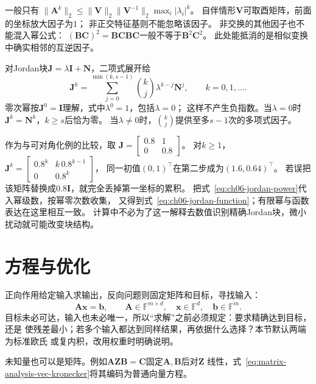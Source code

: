 一般只有
$\lVert\bm A^k\rVert_2\leq
\lVert\bm V\rVert_2\lVert\bm V^{-1}\rVert_2\max_i|\lambda_i|^k$。
自伴情形$\bm V$可取酉矩阵，前面的坐标放大因子为$1$；
非正交特征基则不能忽略该因子。
非交换的其他因子也不能混入幂公式：
$(\bm B\bm C)^2=\bm B\bm C\bm B\bm C$一般不等于$\bm B^2\bm C^2$。
此处能抵消的是相似变换中确实相邻的互逆因子。


对Jordan块$\bm J=\lambda\bm I+\bm N$，二项式展开给
\begin{equation}
 \bm J^k=\sum_{j=0}^{\min(k,s-1)}
       \binom{k}{j}\lambda^{k-j}\bm N^j,\qquad k=0,1,\ldots.
 \label{eq:ch06-jordan-power}
\end{equation}
零次幂按$\bm J^0=\bm I$理解，式中$\lambda^0=1$，包括$\lambda=0$；
这样不产生负指数。当$\lambda=0$时$\bm J^k=\bm N^k$，$k\geq s$后恰为零。
当$\lambda\neq0$时，$\binom{k}{j}$提供至多$s-1$次的多项式因子。

作为与可对角化例的比较，取
$\bm J=\left[\begin{smallmatrix}0.8&1\\0&0.8\end{smallmatrix}\right]$。
对$k\geq1$，
$\bm J^k=\left[\begin{smallmatrix}0.8^k&k\,0.8^{k-1}\\0&0.8^k\end{smallmatrix}\right]$，
同一初值$(0,1)^\top$在第二步成为$(1.6,0.64)^\top$。
若误把该矩阵替换成$0.8\bm I$，就完全丢掉第一坐标的累积。
把式~\eqref{eq:ch06-jordan-power}代入幂级数，按幂零次数收集，
又得到式~\eqref{eq:ch06-jordan-function}；有限幂与函数表达在这里相互一致。
计算中不必为了这一解释去数值识别精确Jordan块，微小扰动就可能改变块结构。

\section{方程与优化}
\label{sec:linear-algebra-reachability-solvability}

正向作用给定输入求输出，反向问题则固定矩阵和目标，寻找输入：
\begin{equation}
 \bm A\bm x=\bm b,\qquad
 \bm A\in\mathbb F^{m\times d},\quad
 \bm x\in\mathbb F^d,\quad\bm b\in\mathbb F^m.
 \label{eq:linear-algebra-linear-system}
\end{equation}
目标未必可达，输入也未必唯一，所以“求解”之前必须规定：要求精确达到目标，还是
使残差最小；若多个输入都达到同样结果，再依据什么选择？本节默认两端为标准欧氏
或复内积，改用权重时明确说明。

未知量也可以是矩阵。例如$\bm A\bm Z\bm B=\bm C$固定$\bm A,\bm B$后对$\bm Z$
线性，式~\eqref{eq:matrix-analysis-vec-kronecker}将其编码为普通向量方程。

